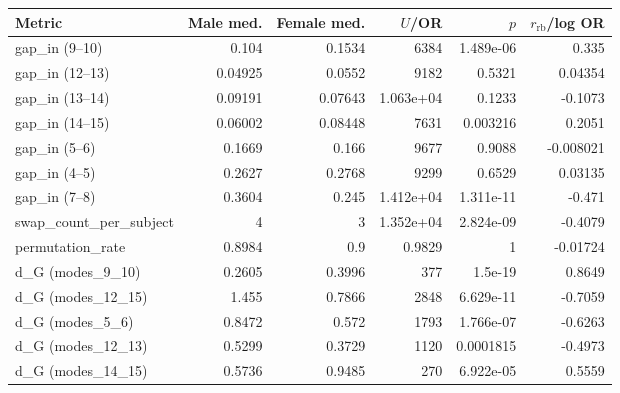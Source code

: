 \begin{tabular}{lrrrrr}
\toprule
Metric & Male med. & Female med. & $U$/OR & $p$ & $r_{\mathrm{rb}}$/log OR \\
\midrule
gap\_in (9--10) & 0.104 & 0.1534 & 6384 & 1.489e-06 & 0.335 \\
gap\_in (12--13) & 0.04925 & 0.0552 & 9182 & 0.5321 & 0.04354 \\
gap\_in (13--14) & 0.09191 & 0.07643 & 1.063e+04 & 0.1233 & -0.1073 \\
gap\_in (14--15) & 0.06002 & 0.08448 & 7631 & 0.003216 & 0.2051 \\
gap\_in (5--6) & 0.1669 & 0.166 & 9677 & 0.9088 & -0.008021 \\
gap\_in (4--5) & 0.2627 & 0.2768 & 9299 & 0.6529 & 0.03135 \\
gap\_in (7--8) & 0.3604 & 0.245 & 1.412e+04 & 1.311e-11 & -0.471 \\
swap\_count\_per\_subject & 4 & 3 & 1.352e+04 & 2.824e-09 & -0.4079 \\
permutation\_rate & 0.8984 & 0.9 & 0.9829 & 1 & -0.01724 \\
d\_G (modes\_9\_10) & 0.2605 & 0.3996 & 377 & 1.5e-19 & 0.8649 \\
d\_G (modes\_12\_15) & 1.455 & 0.7866 & 2848 & 6.629e-11 & -0.7059 \\
d\_G (modes\_5\_6) & 0.8472 & 0.572 & 1793 & 1.766e-07 & -0.6263 \\
d\_G (modes\_12\_13) & 0.5299 & 0.3729 & 1120 & 0.0001815 & -0.4973 \\
d\_G (modes\_14\_15) & 0.5736 & 0.9485 & 270 & 6.922e-05 & 0.5559 \\
\bottomrule
\end{tabular}
